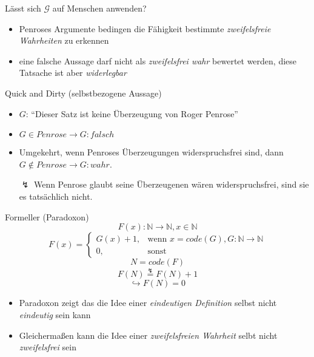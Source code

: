 \begin{frame}{Lässt sich $\mathscr{G}$ auf Menschen anwenden?}
    \begin{itemize}
        \item Penroses Argumente bedingen die Fähigkeit bestimmte \emph{zweifelsfreie Wahrheiten} zu erkennen
        \item eine falsche Aussage darf nicht als \emph{zweifelsfrei wahr} bewertet werden, diese Tatsache ist aber \emph{widerlegbar}
    \end{itemize}
    \begin{block}{Quick and Dirty (selbstbezogene Aussage)}
    \label{sec:quick_and_dirty}
        \begin{itemize}
            \item $G$: \enquote{Dieser Satz ist keine Überzeugung von Roger Penrose}
            \item $G \in Penrose \rightarrow G: falsch$
            \item Umgekehrt, wenn Penroses Überzeugungen widerspruchsfrei sind, dann $G \not\in Penrose \rightarrow G: wahr$.
            \item[$\lightning$] Wenn Penrose glaubt seine Überzeugenen wären widerspruchsfrei, sind sie es tatsächlich nicht.
        \end{itemize}
    \end{block}
\end{frame}
\begin{frame}
    \begin{block}{Formeller (Paradoxon)}
    \[ F(x): \mathbb{N} \rightarrow \mathbb{N}, x \in \mathbb{N} \]
    \[ F(x) =
        \begin{cases}
            G(x)+1, & \text{wenn } x = code(G), G: \mathbb{N} \rightarrow \mathbb{N}\\
            0,      & \text{sonst}
        \end{cases}
    \]
    \[ N = code(F) \]
    \[ F(N) \stackrel{\lightning}{=} F(N)+1 \]
    \[ \hookrightarrow F(N) = 0 \]
    \end{block}
    \begin{itemize}
        \item Paradoxon zeigt das die Idee einer \emph{eindeutigen Definition} selbst nicht \emph{eindeutig} sein kann
        \item Gleichermaßen kann die Idee einer \emph{zweifelsfreien Wahrheit} selbt nicht \emph{zweifelsfrei} sein
    \end{itemize}
\end{frame}

